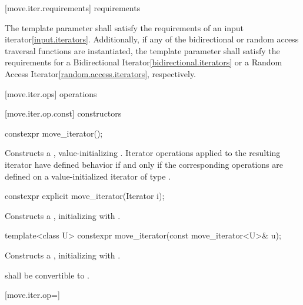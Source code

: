 [move.iter.requirements]{ requirements}

\pnum
The template parameter  shall satisfy
the requirements of an input iterator\ref{input.iterators}.
Additionally, if any of the bidirectional or random access traversal
functions are instantiated, the template parameter shall satisfy the
requirements for a Bidirectional Iterator\ref{bidirectional.iterators}
or a Random Access Iterator\ref{random.access.iterators}, respectively.

[move.iter.ops]{ operations}

[move.iter.op.const]{ constructors}

%
\begin{itemdecl}
constexpr move_iterator();
\end{itemdecl}

\begin{itemdescr}
\pnum
\effects Constructs a , value-initializing
. Iterator operations applied to the resulting
iterator have defined behavior if and only if the corresponding operations are defined
on a value-initialized iterator of type .
\end{itemdescr}


%
\begin{itemdecl}
constexpr explicit move_iterator(Iterator i);
\end{itemdecl}

\begin{itemdescr}
\pnum
\effects Constructs a , initializing
 with .
\end{itemdescr}


%
\begin{itemdecl}
template<class U> constexpr move_iterator(const move_iterator<U>& u);
\end{itemdecl}

\begin{itemdescr}
\pnum
\effects Constructs a , initializing
 with .

\pnum
\requires {} shall be convertible to
.
\end{itemdescr}

[move.iter.op=]{}

